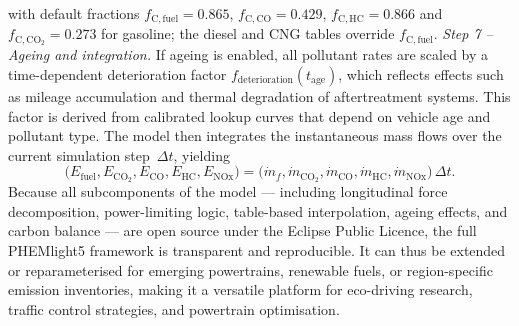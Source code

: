 with default fractions \(f_{\mathrm{C,fuel}}=0.865\), \(f_{\mathrm{C,CO}}=0.429\), \(f_{\mathrm{C,HC}}=0.866\) and \(f_{\mathrm{C,CO_2}}=0.273\) for gasoline; the diesel and CNG tables override \(f_{\mathrm{C,fuel}}\).
\mynewline
\textit{Step 7 – Ageing and integration.}  
If ageing is enabled, all pollutant rates are scaled by a time-dependent deterioration factor \(f_{\mathrm{deterioration}}(t_{\mathrm{age}})\), which reflects effects such as mileage accumulation and thermal degradation of aftertreatment systems. This factor is derived from calibrated lookup curves that depend on vehicle age and pollutant type. The model then integrates the instantaneous mass flows over the current simulation step~\(\Delta t\), yielding
\[
  \bigl(E_{\mathrm{fuel}},E_{\mathrm{CO_2}},E_{\mathrm{CO}},
        E_{\mathrm{HC}},E_{\mathrm{NOx}}\bigr)
  =\bigl(\dot m_{f},\dot m_{\mathrm{CO_2}},\dot m_{\mathrm{CO}},
          \dot m_{\mathrm{HC}},\dot m_{\mathrm{NOx}}\bigr)\,\Delta t.
\]
\mynewline
Because all subcomponents of the model --- including longitudinal force decomposition, power-limiting logic, table-based interpolation, ageing effects, and carbon balance --- are open source under the Eclipse Public Licence, the full PHEMlight5 framework is transparent and reproducible. It can thus be extended or reparameterised for emerging powertrains, renewable fuels, or region-specific emission inventories, making it a versatile platform for eco-driving research, traffic control strategies, and powertrain optimisation.

